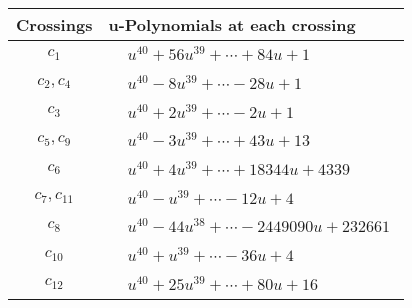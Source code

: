 \documentclass[1p]{elsarticle_modified}
\theoremstyle{definition}
\begin{document}
\begin{tabular}{m{50pt}|m{274pt}}
Crossings & \hspace{64pt}u-Polynomials at each crossing \\
\hline $$\begin{aligned}c_{1}\end{aligned}$$&$\begin{aligned}
&u^{40}+56 u^{39}+\cdots+84 u+1
\end{aligned}$\\
\hline $$\begin{aligned}c_{2},c_{4}\end{aligned}$$&$\begin{aligned}
&u^{40}-8 u^{39}+\cdots-28 u+1
\end{aligned}$\\
\hline $$\begin{aligned}c_{3}\end{aligned}$$&$\begin{aligned}
&u^{40}+2 u^{39}+\cdots-2 u+1
\end{aligned}$\\
\hline $$\begin{aligned}c_{5},c_{9}\end{aligned}$$&$\begin{aligned}
&u^{40}-3 u^{39}+\cdots+43 u+13
\end{aligned}$\\
\hline $$\begin{aligned}c_{6}\end{aligned}$$&$\begin{aligned}
&u^{40}+4 u^{39}+\cdots+18344 u+4339
\end{aligned}$\\
\hline $$\begin{aligned}c_{7},c_{11}\end{aligned}$$&$\begin{aligned}
&u^{40}- u^{39}+\cdots-12 u+4
\end{aligned}$\\
\hline $$\begin{aligned}c_{8}\end{aligned}$$&$\begin{aligned}
&u^{40}-44 u^{38}+\cdots-2449090 u+232661
\end{aligned}$\\
\hline $$\begin{aligned}c_{10}\end{aligned}$$&$\begin{aligned}
&u^{40}+u^{39}+\cdots-36 u+4
\end{aligned}$\\
\hline $$\begin{aligned}c_{12}\end{aligned}$$&$\begin{aligned}
&u^{40}+25 u^{39}+\cdots+80 u+16
\end{aligned}$\\
\hline
\end{tabular}\\~\\
\end{document}
